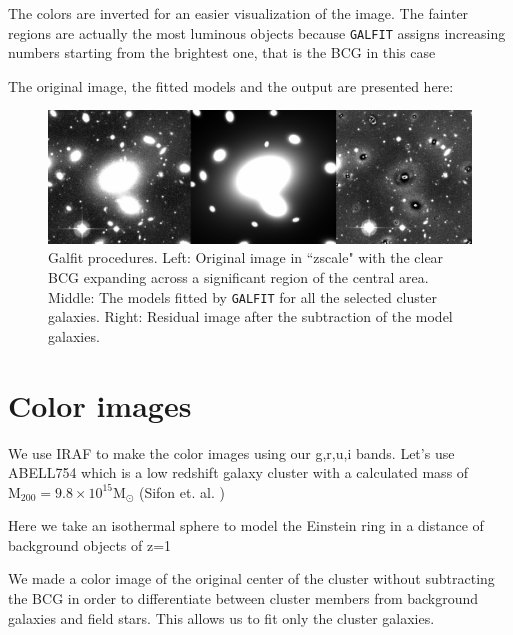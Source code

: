 The colors are inverted for an easier visualization of the image. The fainter regions are actually the most luminous objects because \texttt{GALFIT} assigns increasing numbers starting from the brightest one, that is the BCG in this case

The original image, the fitted models and the output are presented here:

\begin{figure}[H]
\centering
\includegraphics[width=15cm]{images/galfit.png}
\caption[Galfit results]{Galfit procedures. Left: Original image in ``zscale" with the clear BCG expanding across a significant region of the central area. Middle: The models fitted by \texttt{GALFIT} for all the selected cluster galaxies. Right: Residual image after the subtraction of the model galaxies.}
\end{figure}

\section{Color images} 

We use IRAF to make the color images using our g,r,u,i bands. Let's use ABELL754 which is a low redshift galaxy cluster with a calculated mass of $\text{M}_{200}=9.8\times 10^{15} \text{M}_{\odot}$ (Sifon et. al. \citeyear{Reference9})

Here we take an isothermal sphere to model the Einstein ring in a distance of background objects of z=1

We made a color image of the original center of the cluster without subtracting the BCG in order to differentiate between cluster members from background galaxies and field stars. This allows us to fit only the cluster galaxies. 

